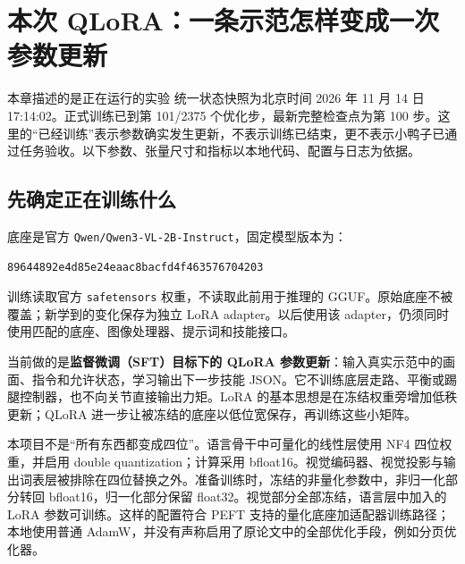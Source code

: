 \chapter{本次 QLoRA：一条示范怎样变成一次参数更新}

\begin{notebox}{本章描述的是正在运行的实验}
统一状态快照为北京时间 2026 年 11 月 14 日 17:14:02。正式训练已到第 101/2375 个优化步，最新完整检查点为第 100 步。这里的“已经训练”表示参数确实发生更新，不表示训练已结束，更不表示小鸭子已通过任务验收。以下参数、张量尺寸和指标以本地代码、配置与日志为依据。
\end{notebox}

\section{先确定正在训练什么}

底座是官方 \texttt{Qwen/Qwen3-VL-2B-Instruct}，固定模型版本为：
\begin{Verbatim}[breaklines=true,fontsize=\small]
89644892e4d85e24eaac8bacfd4f463576704203
\end{Verbatim}
训练读取官方 \texttt{safetensors} 权重，不读取此前用于推理的 GGUF。原始底座不被覆盖；新学到的变化保存为独立 LoRA adapter。以后使用该 adapter，仍须同时使用匹配的底座、图像处理器、提示词和技能接口。

当前做的是\textbf{监督微调（SFT）目标下的 QLoRA 参数更新}：输入真实示范中的画面、指令和允许状态，学习输出下一步技能 JSON。它不训练底层走路、平衡或踢腿控制器，也不向关节直接输出力矩。LoRA 的基本思想是在冻结权重旁增加低秩更新；QLoRA 进一步让被冻结的底座以低位宽保存，再训练这些小矩阵。\cite{lora-paper,qlora-paper}

本项目不是“所有东西都变成四位”。语言骨干中可量化的线性层使用 NF4 四位权重，并启用 double quantization；计算采用 bfloat16。视觉编码器、视觉投影与输出词表层被排除在四位替换之外。准备训练时，冻结的非量化参数中，非归一化部分转回 bfloat16，归一化部分保留 float32。视觉部分全部冻结，语言层中加入的 LoRA 参数可训练。这样的配置符合 PEFT 支持的量化底座加适配器训练路径；本地使用普通 AdamW，并没有声称启用了原论文中的全部优化手段，例如分页优化器。\cite{peft-quantization}

